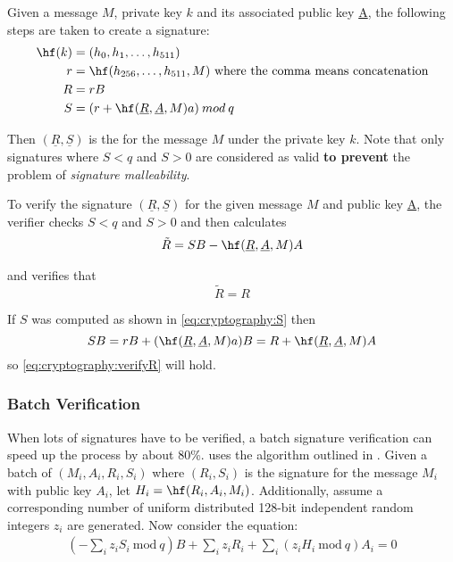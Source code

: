 Given a message $M$, private key $k$ and its associated public key \underline{A}, the following steps are taken to create a signature:
\begin{align}
	\hf(k) &=(h_0, h_1, \ldots, h_{511}) \\
	r &= \hf(h_{256}, \ldots, h_{511}, M) \text{ where the comma means concatenation} \\
	R &= rB \\
	S &= (r + \hf(\underline{R}, \underline{A}, M)a) \: mod \: q \label{eq:cryptography:S}
\end{align}

Then $(\underline{R}, \underline{S})$ is the  for the message $M$ under the private key $k$.
Note that only signatures where $S<q$ and $S>0$ are considered as valid \textbf{to prevent} the problem of \emph{signature malleability}.

To verify the signature $(\underline{R}, \underline{S})$ for the given message $M$ and public key \underline{A}, the verifier checks $S<q$ and $S>0$ and then calculates
\begin{align*}
	\tilde{R} = SB - \hf(\underline{R}, \underline{A}, M)A
\end{align*}

and verifies that
\begin{equation}
	\tilde{R} = R \label{eq:cryptography:verifyR}
\end{equation}

If $S$ was computed as shown in \eqref{eq:cryptography:S} then
$$SB = rB + (\hf(\underline{R}, \underline{A}, M)a)B = R + \hf(\underline{R}, \underline{A}, M)A$$
so \eqref{eq:cryptography:verifyR} will hold.

\subsubsection{Batch Verification}

When lots of signatures have to be verified, a batch signature verification can speed up the process by about 80\%.
\codenamespace uses the algorithm outlined in \cite{Bernstein2011}.
Given a batch of $(M_i, A_i, R_i, S_i)$ where $(R_i, S_i)$ is the signature for the message $M_i$ with public key $A_i$,
let $H_i = \hf(R_i, A_i, M_i)$.
Additionally, assume a corresponding number of uniform distributed 128-bit independent random integers $z_i$ are generated.
Now consider the equation:
\begin{align}
	\left(-\sum_i{z_i S_i \: \mathrm{mod} \: q}\right)B + \sum_i{z_i R_i} + \sum_i{(z_i H_i \: \mathrm{mod} \: q)A_i = 0} \label{eq:cryptography:verifyBatch}
\end{align}

